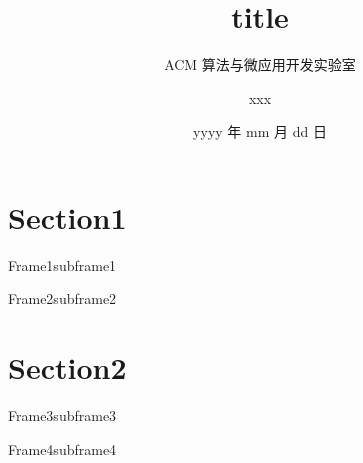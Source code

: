 \documentclass{pptt}
\title{title}
\author{ACM 算法与微应用开发实验室 \and xxx}
\date{yyyy 年 mm 月 dd 日}
\begin{document}
\maketitle

\section{Section1}

\begin{frame}{Frame1}{subframe1}
\end{frame}

\begin{frame}{Frame2}{subframe2}
\end{frame}

\section{Section2}

\begin{frame}{Frame3}{subframe3}
\end{frame}

\begin{frame}{Frame4}{subframe4}
\end{frame}
\end{document}

